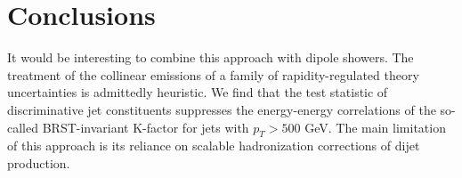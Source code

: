 \section{Conclusions}\label{sec:conclusions}

It would be interesting to combine this approach with dipole showers.
The treatment of the collinear emissions of a family of
rapidity-regulated theory uncertainties is admittedly heuristic. We find
that the test statistic of discriminative jet constituents suppresses
the energy-energy correlations of the so-called BRST-invariant K-factor
for jets with $p_T > 500$ GeV. The main limitation of this approach is
its reliance on scalable hadronization corrections of dijet production.

